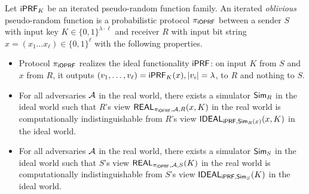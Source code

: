 \begin{definition}[$\proto$]
  Let $\mathsf{i}\mathsf{PRF}_K$ be an iterated pseudo-random function family.  An
  iterated \emph{oblivious} pseudo-random function is a probabilistic
  protocol $\proto$ between a sender $S$ with input key
  $K\in\{0,1\}^{\lambda\cdot\ell}$ and receiver $R$ with input bit string
  $x=(x_1\ldots{}x_\ell)\in\{0,1\}^{\ell}$ with the following
  properties.

  \begin{itemize}
   
\item Protocol $\proto$ realizes the ideal functionality $\mathsf{i}\mathsf{PRF}$: on
  input $K$ from $S$ and $x$ from $R$, it outputs
  $(v_1,\ldots,v_\ell)=\mathsf{i}\mathsf{PRF}_K(x),|v_i|=\lambda$, to
  $R$ and nothing to $S$.
  
\item For all adversaries ${\mathcal{A}}$ in the real world, there exists a
  simulator ${\mathsf{Sim}}_R$ in the ideal world such that $R$'s view
  $\mathsf{REAL}_{{\pi_{\mathsf{i}\mathsf{OPRF}}},{\mathcal{A}},R}(x,K)$ in the real world is
  computationally indistinguishable from $R$'s view
  $\mathsf{IDEAL}_{\mathsf{i}\mathsf{PRF},{\mathsf{Sim}}_R(x)}(x,K)$ in
  the ideal world.

\item
   For all adversaries ${\mathcal{A}}$ in the real world, there exists a
  simulator ${\mathsf{Sim}}_S$ in the ideal world such that $S$'s view
  $\mathsf{REAL}_{{\pi_{\mathsf{i}\mathsf{OPRF}}},{\mathcal{A}},S}(K)$ in the real world is
  computationally indistinguishable from $S$'s view
  $\mathsf{IDEAL}_{\mathsf{i}\mathsf{PRF},{\mathsf{Sim}}_S}(K)$ in
  the ideal world.  
\end{itemize}
\end{definition}

